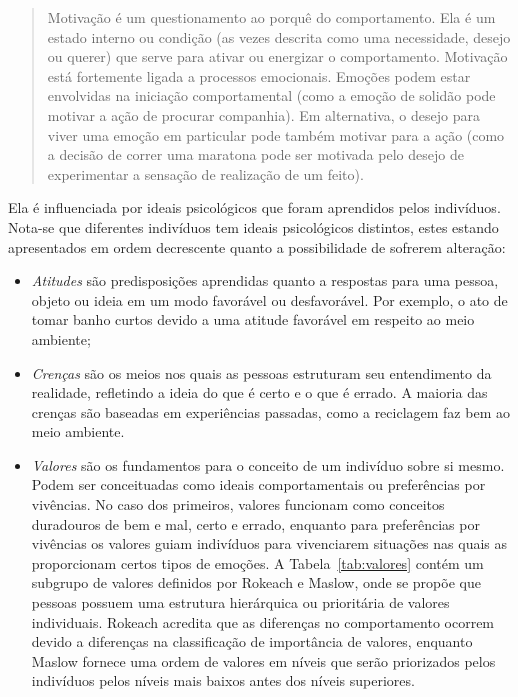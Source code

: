 \begin{quote}
Motivação é um questionamento ao porquê do comportamento. Ela é um estado
interno ou condição (as vezes descrita como uma necessidade, desejo ou querer)
que serve para ativar ou energizar o comportamento. Motivação está fortemente
ligada a processos emocionais. Emoções podem estar envolvidas na iniciação
comportamental (como a emoção de solidão pode motivar a ação de procurar
companhia). Em alternativa, o desejo para viver uma emoção em particular pode
também motivar para a ação (como a decisão de correr uma maratona pode ser
motivada pelo desejo de experimentar a sensação de realização de um feito).
\end{quote}

Ela é influenciada por ideais psicológicos que foram aprendidos pelos
indivíduos. Nota-se que diferentes indivíduos tem ideais psicológicos distintos,
estes estando apresentados em ordem decrescente quanto a possibilidade de 
sofrerem alteração:

\begin{itemize}
\item \emph{Atitudes} são predisposições aprendidas quanto a respostas
para uma pessoa, objeto ou ideia em um modo favorável ou desfavorável. Por
exemplo, o ato de tomar banho curtos devido a uma atitude favorável em respeito
ao meio ambiente;
\item \emph{Crenças} são os meios nos quais as pessoas estruturam seu
entendimento da realidade, refletindo a ideia do que é certo e o que é errado. 
A maioria das crenças são baseadas em experiências passadas, como a reciclagem 
faz bem ao meio ambiente.
\item \emph{Valores} são os fundamentos para o conceito de um indivíduo sobre si
mesmo. Podem ser conceituadas como ideais comportamentais ou preferências por
vivências. No caso dos primeiros, valores funcionam como conceitos duradouros de
bem e mal, certo e errado, enquanto para preferências por vivências os valores
guiam indivíduos para vivenciarem situações nas quais as proporcionam certos
tipos de emoções. A Tabela~\ref{tab:valores} contém um subgrupo de valores
definidos por Rokeach e Maslow, onde se propõe que pessoas possuem
uma estrutura hierárquica ou prioritária de valores individuais. Rokeach
acredita que as diferenças no comportamento ocorrem devido a diferenças na
classificação de importância de valores, enquanto Maslow fornece uma ordem de
valores em níveis que serão priorizados pelos indivíduos pelos níveis mais
baixos antes dos níveis superiores.
\end{itemize}

